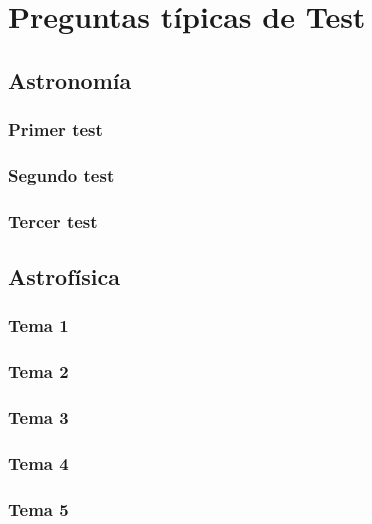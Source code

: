 
\chapter{Preguntas típicas de Test}

\section{Astronomía}

\subsection{Primer test}

\subsection{Segundo test}

\subsection{Tercer test}

\section{Astrofísica}

\subsection{Tema 1}

\subsection{Tema 2}

\subsection{Tema 3}

\subsection{Tema 4}

\subsection{Tema 5}
